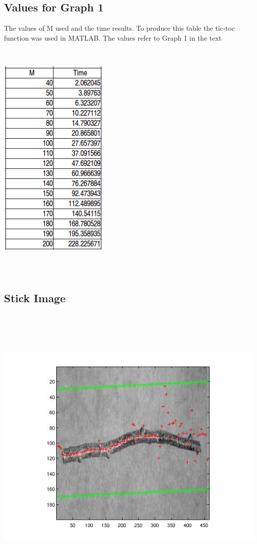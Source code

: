 \documentclass[12pt,a4paper,twocolumn]{article}
\begin{document}
\subsection{Values for Graph 1}
The values of M used and the time results. To produce this table the tic-toc function was used in MATLAB. The values refer to Graph 1 in the text
\newline
\includegraphics[width=150pt,height=350pt,scale=1]{table.png}	
\newpage
\mbox{}
\newpage
\mbox{}
\subsection{Stick Image}
\includegraphics[width=500pt,height=400pt,scale=1]{stick_cont.jpg}	
\end{document}
